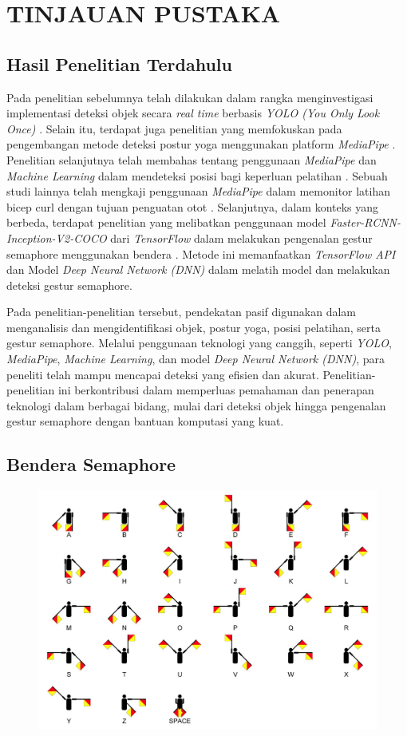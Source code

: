 \chapter{TINJAUAN PUSTAKA}

\section{Hasil Penelitian Terdahulu}
Pada penelitian sebelumnya telah dilakukan dalam rangka menginvestigasi implementasi deteksi objek secara \textit{real time} berbasis \textit{YOLO (You Only Look Once)} \cite{redmon2016you}. Selain itu, terdapat juga penelitian yang memfokuskan pada pengembangan metode deteksi postur yoga menggunakan platform \textit{MediaPipe} \cite{garg2022yoga}. Penelitian selanjutnya telah membahas tentang penggunaan \textit{MediaPipe} dan \textit{Machine Learning} dalam mendeteksi posisi bagi keperluan pelatihan \cite{supanich2023machine}. Sebuah studi lainnya telah mengkaji penggunaan \textit{MediaPipe} dalam memonitor latihan bicep curl dengan tujuan penguatan otot \cite{nguyen2023assessing}. Selanjutnya, dalam konteks yang berbeda, terdapat penelitian yang melibatkan penggunaan model \textit{Faster-RCNN-Inception-V2-COCO} dari \textit{TensorFlow} dalam melakukan pengenalan gestur semaphore menggunakan bendera \cite{motty2023flag}. Metode ini memanfaatkan \textit{TensorFlow API} dan Model \textit{Deep Neural Network (DNN)} dalam melatih model dan melakukan deteksi gestur semaphore.

Pada penelitian-penelitian tersebut, pendekatan pasif digunakan dalam menganalisis dan mengidentifikasi objek, postur yoga, posisi pelatihan, serta gestur semaphore. Melalui penggunaan teknologi yang canggih, seperti \textit{YOLO}, \textit{MediaPipe}, \textit{Machine Learning}, dan model \textit{Deep Neural Network (DNN)}, para peneliti telah mampu mencapai deteksi yang efisien dan akurat. Penelitian-penelitian ini berkontribusi dalam memperluas pemahaman dan penerapan teknologi dalam berbagai bidang, mulai dari deteksi objek hingga pengenalan gestur semaphore dengan bantuan komputasi yang kuat.

\section{Bendera Semaphore}
\begin{figure}[hbt!]
	\includegraphics[width=0.7\linewidth]{gambar/bener/Semaphore-Pose.jpg}
	\label{fig:BenderaSemaphore}
\end{figure}


